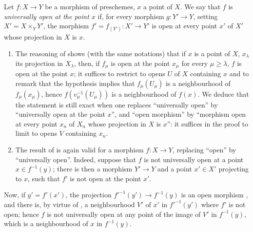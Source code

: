 \begin{definition}[14.3.3]
\label{IV.14.3.3}
Let $f:X\to Y$ be a morphism of preschemes, $x$ a point of $X$.
We say that $f$ is \emph{universally open at the point $x$} if, for every morphism $g:Y'\to Y$, setting $X'=X\times_Y Y'$, the morphism $f'=f_{(Y')}:X'\to Y'$ is open at every point $x'$ of $X'$ whose projection in $X$ is $x$.
\end{definition}

\begin{remarks}[14.3.3.1]
\label{IV.14.3.3.1}
\begin{enumerate}[label=(\roman*)]
  \item The reasoning of  shows (with the same notations) that if $x$ is a point of $X$, $x_\lambda$ its projection in $X_\lambda$, then, if $f_\mu$ is open at the point $x_\mu$ for every $\mu\geq\lambda$, $f$ is open at the point $x$; it suffices to restrict to opens $U$ of $X$ containing $x$ and to remark that the hypothesis implies that $f_\mu(U_\mu)$ is a neighbourhood of $f_\mu(x_\mu)$, hence $f(v_\mu^{-1}(U_\mu))$ is a neighbourhood of $f(x)$.
  We deduce that the statement  is still exact when one replaces ``universally open'' by ``universally open at the point $x$'', and ``open morphism'' by ``morphism open at every point $x_n$ of $X_n$ whose projection in $X$ is $x$'': it suffices in the proof to limit to opens $V$ containing $x_n$.

  \item The result of  is again valid for a morphism $f:X\to Y$, replacing ``open'' by ``universally open''.
  Indeed, suppose that $f$ is not universally open at a point $x\in f^{-1}(y)$; there is then a morphism $Y'\to Y$ and a point $x'\in X'$ projecting to $x$, such that $f'$ is not open at the point $x'$.
\end{enumerate}
\end{remarks}


Now, if $y'=f'(x')$, the projection $f'^{-1}(y')\to f^{-1}(y)$ is an open morphism , and there is, by virtue of , a neighbourhood $V'$ of $x'$ in $f'^{-1}(y')$ where $f'$ is not open; hence $f$ is not universally open at any point of the image of $V'$ in $f^{-1}(y)$, which is a neighbourhood of $x$ in $f^{-1}(y)$.

